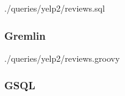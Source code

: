 

{./queries/yelp2/reviews.sql}

\subsubsection{Gremlin}




{./queries/yelp2/reviews.groovy}

\subsubsection{GSQL}


